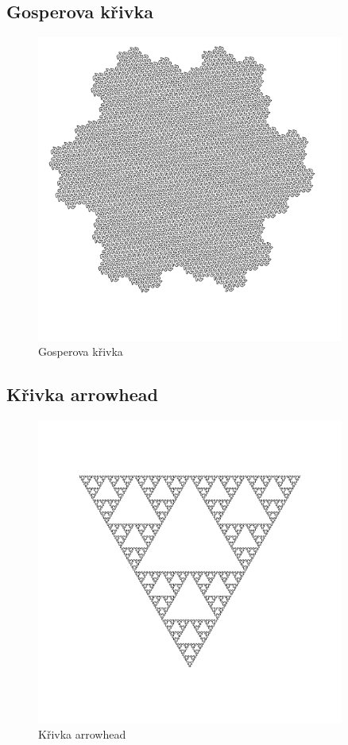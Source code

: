 \subsection{Gosperova křivka}



\begin{figure}[p]
  \centering

  \includegraphics[width=0.9\textwidth]{krunimir/examples/gosper}
  \caption{Gosperova křivka}\label{fig:krunimir-gosper}
\end{figure}

\subsection{Křivka arrowhead}



\begin{figure}[p]
  \centering

  \includegraphics[width=0.9\textwidth]{krunimir/examples/arrowhead}
  \caption{Křivka arrowhead}\label{fig:krunimir-arrowhead}
\end{figure}
